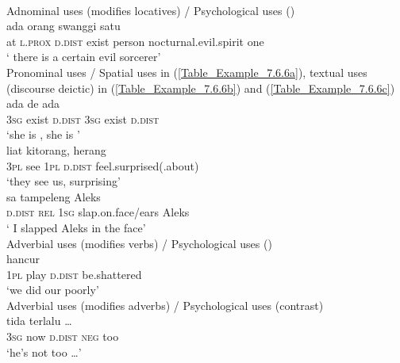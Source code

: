 {\\
\z
\ea
\label{Table_Example_7.6.5}
Adnominal uses (modifies locatives) / Psychological uses ()\\
   {ada} {orang} {swanggi} {satu}  \\
 at \textsc{l.prox} \textsc{d.dist} exist person nocturnal.evil.spirit one \\
\glt ‘\bluebold{)} there is a certain evil  sorcerer’ \\
\z
\ea
\label{Table_Example_7.6.6}
Pronominal uses / Spatial uses in (\ref{Table_Example_7.6.6a}), textual uses (discourse deictic) in (\ref{Table_Example_7.6.6b}) and (\ref{Table_Example_7.6.6c})\\
\ea
\label{Table_Example_7.6.6a}
 {ada}  {de} {ada}   \\
 \textsc{3sg} exist \textsc{d.dist} \textsc{3sg} exist \textsc{d.dist}  \\
\glt ‘she is , she is ’\\
\vspace{5pt}
\ex
\label{Table_Example_7.6.6b}
 {liat} {kitorang,}  {herang} \\
 \textsc{3pl} see \textsc{1pl} \textsc{d.dist} feel.surprised(.about)  \\
\glt  ‘they see us,  surprising’\\
\vspace{5pt}
\ex
\label{Table_Example_7.6.6c}
\gll  {}  {sa} {tampeleng} {Aleks}  \\
   \textsc{d.dist} \textsc{rel} \textsc{1sg} slap.on.face/ears Aleks  \\
\glt  ‘ I slapped Aleks in the face’ \\
\z
\z
\ea
\label{Table_Example_7.6.7}
Adverbial uses (modifies verbs) / Psychological uses ()\\
   {hancur}\\
 \textsc{1pl} play \textsc{d.dist} be.shattered \\
\glt  ‘we did our  poorly’\\
\z
\ea
\label{Table_Example_7.6.8}Adverbial uses (modifies adverbs) / Psychological uses (contrast)\\
   {tida} {terlalu} {\ldots} \\
\textsc{3sg} now \textsc{d.dist} \textsc{neg} too \\
\glt  ‘he’s  not too \ldots’\\
\z

}
